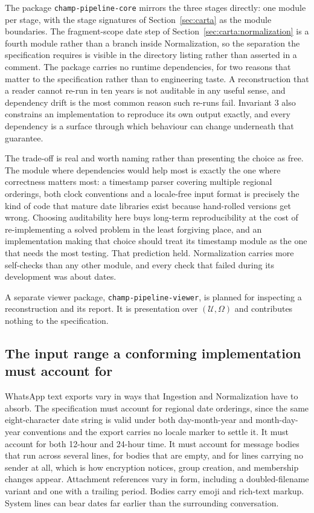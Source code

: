 The package \texttt{champ-pipeline-core} mirrors the three stages directly: one
module per stage, with the stage signatures of Section~\ref{sec:carta} as the
module boundaries. The fragment-scope date step of
Section~\ref{sec:carta:normalization} is a fourth module rather than a branch
inside Normalization, so the separation the specification requires is visible in
the directory listing rather than asserted in a comment. The package carries no
runtime dependencies, for two reasons that matter to the specification rather than
to engineering taste. A reconstruction that a reader cannot re-run in ten years is
not auditable in any useful sense, and dependency drift is the most common reason
such re-runs fail. Invariant 3 also constrains an implementation to reproduce its
own output exactly, and every dependency is a surface through which behaviour can
change underneath that guarantee.

The trade-off is real and worth naming rather than presenting the choice as free.
The module where dependencies would help most is exactly the one where correctness
matters most: a timestamp parser covering multiple regional orderings, both clock
conventions and a locale-free input format is precisely the kind of code that
mature date libraries exist because hand-rolled versions get wrong. Choosing
auditability here buys long-term reproducibility at the cost of re-implementing a
solved problem in the least forgiving place, and an implementation making that
choice should treat its timestamp module as the one that needs the most testing.
That prediction held. Normalization carries more self-checks than any other
module, and every check that failed during its development was about dates.

A separate viewer package, \texttt{champ-pipeline-viewer}, is planned for
inspecting a reconstruction and its report. It is presentation over
$(\mathcal{U}, \Omega)$ and contributes nothing to the specification.

\subsection{The input range a conforming implementation must account for}
\label{sec:implementation:inputs}

WhatsApp text exports vary in ways that Ingestion and Normalization have to
absorb. The specification must account for regional date orderings, since the same
eight-character date string is valid under both day-month-year and month-day-year
conventions and the export carries no locale marker to settle it. It must account
for both 12-hour and 24-hour time. It must account for message bodies that run
across several lines, for bodies that are empty, and for lines carrying no sender
at all, which is how encryption notices, group creation, and membership changes
appear. Attachment references vary in form, including a doubled-filename variant
and one with a trailing period. Bodies carry emoji and rich-text markup. System
lines can bear dates far earlier than the surrounding conversation.

